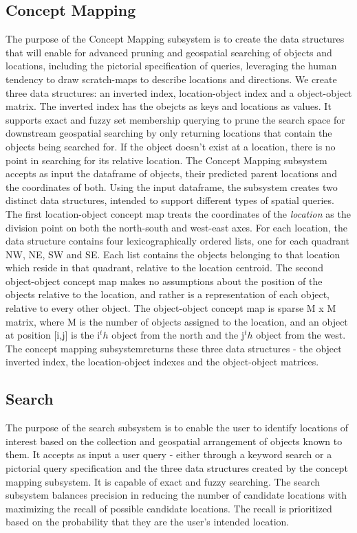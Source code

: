 \subsection{Concept Mapping}
The purpose of the Concept Mapping subsystem is to create the data structures that will enable for advanced pruning and  geospatial searching of objects and locations, including the pictorial specification of queries, leveraging the human tendency to draw scratch-maps to describe locations and directions. 
We create three data structures: an inverted index, location-object index and a object-object matrix. 
The inverted index has the obejcts as keys and locations as values. It supports exact and fuzzy set membership querying to prune the search space for downstream geospatial searching by only returning locations that contain the objects being searched for. If the object doesn't exist at a location, there is no point in searching for its relative location.
The Concept Mapping subsystem accepts as input the dataframe of objects, their predicted parent locations and the coordinates of both. 
Using the input dataframe, the subsystem creates two distinct data structures, intended to support different types of spatial queries. 
The first location-object concept map treats the coordinates of the \textit{location} as the division point on both the north-south and west-east axes. 
For each location, the data structure contains four lexicographically ordered lists, one for each quadrant NW, NE, SW and SE. 
Each list contains the objects belonging to that location which reside in that quadrant, relative to the location centroid. 
The second object-object concept map makes no assumptions about the position of the objects relative to the location, and rather is a representation of each object, relative to every other object. 
The object-object concept map is sparse M x M matrix, where M is the number of objects assigned to the location, and an object at position [i,j] is the i$^th$ object from the north and the j$^th$ object from the west. 
The concept mapping subsystemreturns these three data structures - the object inverted index, the location-object indexes and the object-object matrices. 

\subsection{Search}
The purpose of the search subsystem is to enable the user to identify locations of interest based on the collection and geospatial arrangement of objects known to them. 
It accepts as input a user query - either through a keyword search or a pictorial query specification and the three data structures created by the concept mapping subsystem. 
It is capable of exact and fuzzy searching. 
The search subsystem balances precision in reducing the number of candidate locations with maximizing the recall of possible candidate locations. 
The recall is prioritized based on the probability that they are the user's intended location. 




